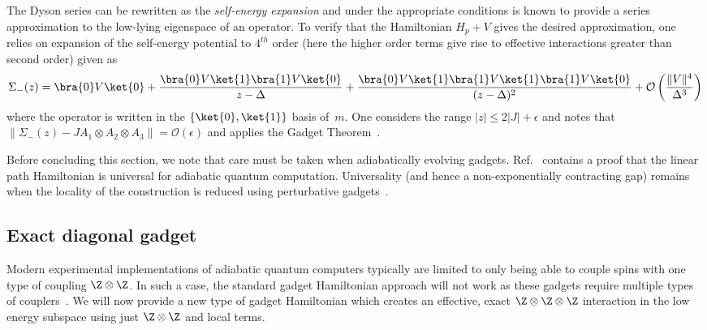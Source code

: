 \documentclass[11pt,oneside,final]{huthesis}%
\begin{document}
The Dyson series can be rewritten as the \textit{self-energy expansion} and under the
appropriate conditions is known to provide a series approximation to the
low-lying eigenspace of an operator. To verify that the Hamiltonian $H_p + V$
gives the desired approximation, one relies on expansion of the self-energy potential 
to $4^{th}$ order (here the higher order terms give rise to
effective interactions greater than second order) given as
\begin{equation}
\label{eqn:se}
\Sigma_-(z) = \bra{0}V\ket{0}
+\frac{\bra{0}V\ket{1}\bra{1}V\ket{0}}{z-\Delta}
+\frac{\bra{0}V\ket{1}\bra{1}V\ket{1}\bra{1}V\ket{0}}{(z-\Delta)^2}
+\mathcal{O}\left(\frac{\|V\|^4}{\Delta^3}\right)
\end{equation}
where the operator is written in the $\{\ket{0},\ket{1}\}$ basis of~$m$.
One considers the range $|z|\leq2|J|+\epsilon$ and notes that
$\|\Sigma_-(z)-JA_1\otimes A_2 \otimes A_3\| = \mathcal{O}(\epsilon)$
and applies the Gadget Theorem~\cite{Kempe06}.


Before concluding this section, we note that care must be taken when adiabatically evolving gadgets.  Ref.~\cite{Aharonov07} contains a proof that the linear path Hamiltonian is universal for adiabatic quantum computation.  Universality (and hence a non-exponentially contracting gap) remains when the locality of the construction is reduced using perturbative gadgets~\cite{Oliveira08}.  

\subsection{Exact diagonal gadget}
Modern experimental implementations of adiabatic quantum computers
typically are limited to only being able to couple spins with one type
of coupling \eg $\Z \otimes \Z$.  In such a case, the standard
gadget Hamiltonian approach will not work as these gadgets require
multiple types of couplers~\cite{Biamonte08classical}.  We will now provide
a new type of gadget Hamiltonian which creates an
effective, exact $\Z \otimes \Z \otimes \Z$
interaction in the low energy subspace using just
$\Z \otimes \Z$ and local terms.
\end{document}
